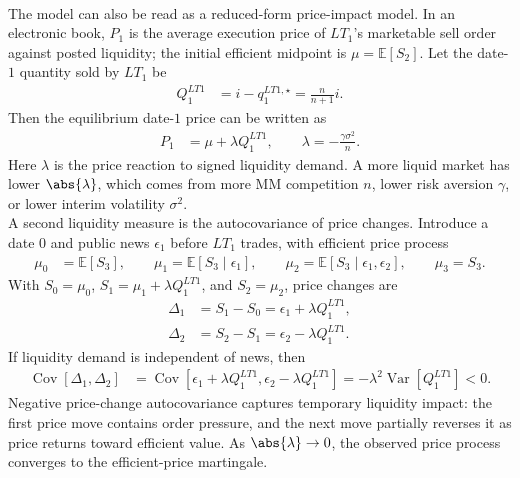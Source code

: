 \begin{model}
\par\smallskip\noindent{}\\
The model can also be read as a reduced-form price-impact model. In an electronic book, $P_1$ is the average execution price of $LT_1$'s marketable sell order against posted liquidity; the initial efficient midpoint is $\mu=\mathbb{E}[S_2]$. Let the date-$1$ quantity sold by $LT_1$ be
\begin{align*}
Q_1^{LT1}&=i-q_1^{LT1,\star}=\frac{n}{n+1}i.
\end{align*}
Then the equilibrium date-$1$ price can be written as
\begin{align*}
P_1&=\mu+\lambda Q_1^{LT1}, \qquad
\lambda=-\frac{\gamma\sigma^2}{n}.
\end{align*}
Here $\lambda$ is the price reaction to signed liquidity demand. A more liquid market has lower $\abs{\lambda}$, which comes from more MM competition $n$, lower risk aversion $\gamma$, or lower interim volatility $\sigma^2$.\\
A second liquidity measure is the autocovariance of price changes. Introduce a date $0$ and public news $\epsilon_1$ before $LT_1$ trades, with efficient price process
\begin{align*}
\mu_0&=\mathbb{E}[S_3], \qquad
\mu_1=\mathbb{E}[S_3\mid\epsilon_1], \qquad
\mu_2=\mathbb{E}[S_3\mid\epsilon_1,\epsilon_2], \qquad
\mu_3=S_3.
\end{align*}
With $S_0=\mu_0$, $S_1=\mu_1+\lambda Q_1^{LT1}$, and $S_2=\mu_2$, price changes are
\begin{align*}
\Delta_1&=S_1-S_0=\epsilon_1+\lambda Q_1^{LT1},\\
\Delta_2&=S_2-S_1=\epsilon_2-\lambda Q_1^{LT1}.
\end{align*}
If liquidity demand is independent of news, then
\begin{align*}
\operatorname{Cov}[\Delta_1,\Delta_2]
&=\operatorname{Cov}[\epsilon_1+\lambda Q_1^{LT1},\epsilon_2-\lambda Q_1^{LT1}]
=-\lambda^2\operatorname{Var}[Q_1^{LT1}]<0.
\end{align*}
Negative price-change autocovariance captures temporary liquidity impact: the first price move contains order pressure, and the next move partially reverses it as price returns toward efficient value. As $\abs{\lambda}\to0$, the observed price process converges to the efficient-price martingale.
\end{model}


